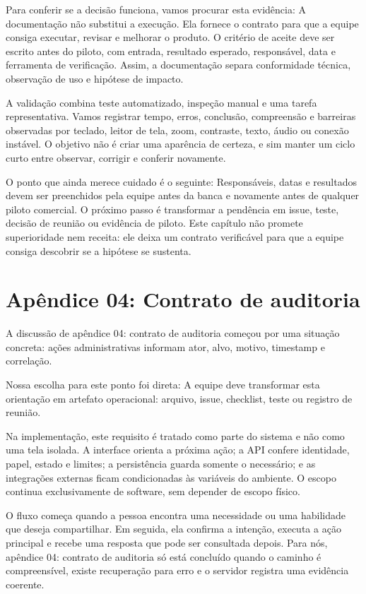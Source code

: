 \documentclass[12pt,oneside,a4paper,article]{abntex2}
\begin{document}
Para conferir se a decisão funciona, vamos procurar esta evidência: A documentação não substitui a execução. Ela fornece o contrato para que a equipe consiga executar, revisar e melhorar o produto. O critério de aceite deve ser escrito antes do piloto, com entrada, resultado esperado, responsável, data e ferramenta de verificação. Assim, a documentação separa conformidade técnica, observação de uso e hipótese de impacto.

A validação combina teste automatizado, inspeção manual e uma tarefa representativa. Vamos registrar tempo, erros, conclusão, compreensão e barreiras observadas por teclado, leitor de tela, zoom, contraste, texto, áudio ou conexão instável. O objetivo não é criar uma aparência de certeza, e sim manter um ciclo curto entre observar, corrigir e conferir novamente.

O ponto que ainda merece cuidado é o seguinte: Responsáveis, datas e resultados devem ser preenchidos pela equipe antes da banca e novamente antes de qualquer piloto comercial. O próximo passo é transformar a pendência em issue, teste, decisão de reunião ou evidência de piloto. Este capítulo não promete superioridade nem receita: ele deixa um contrato verificável para que a equipe consiga descobrir se a hipótese se sustenta.

\section{Apêndice 04: Contrato de auditoria}
A discussão de apêndice 04: contrato de auditoria começou por uma situação concreta: ações administrativas informam ator, alvo, motivo, timestamp e correlação.

Nossa escolha para este ponto foi direta: A equipe deve transformar esta orientação em artefato operacional: arquivo, issue, checklist, teste ou registro de reunião.

Na implementação, este requisito é tratado como parte do sistema e não como uma tela isolada. A interface orienta a próxima ação; a API confere identidade, papel, estado e limites; a persistência guarda somente o necessário; e as integrações externas ficam condicionadas às variáveis do ambiente. O escopo continua exclusivamente de software, sem depender de escopo físico.

O fluxo começa quando a pessoa encontra uma necessidade ou uma habilidade que deseja compartilhar. Em seguida, ela confirma a intenção, executa a ação principal e recebe uma resposta que pode ser consultada depois. Para nós, apêndice 04: contrato de auditoria só está concluído quando o caminho é compreensível, existe recuperação para erro e o servidor registra uma evidência coerente.
\end{document}
